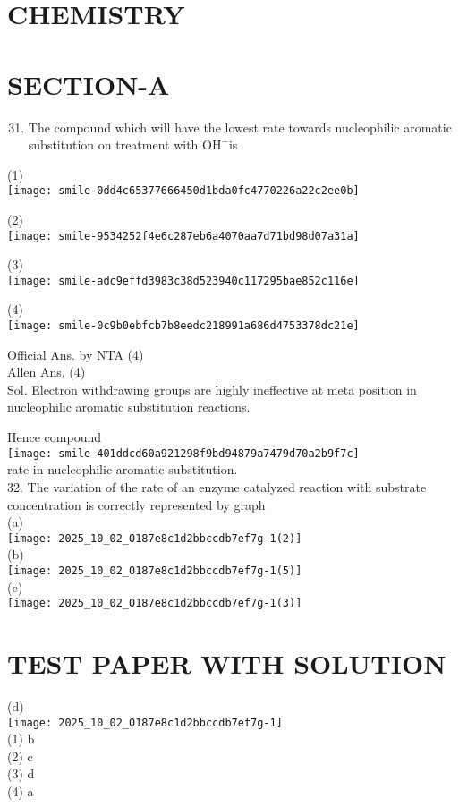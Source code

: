 \documentclass[10pt]{article}
\begin{document}
\captionsetup{singlelinecheck=false}
\section*{CHEMISTRY}
\section*{SECTION-A}
\begin{enumerate}
  \setcounter{enumi}{30}
  \item The compound which will have the lowest rate towards nucleophilic aromatic substitution on treatment with \(\mathrm{OH}^{-}\)is
\end{enumerate}

(1)\\
\texttt{[image: smile-0dd4c65377666450d1bda0fc4770226a22c2ee0b]}

(2)\\
\texttt{[image: smile-9534252f4e6c287eb6a4070aa7d71bd98d07a31a]}

(3)\\
\texttt{[image: smile-adc9effd3983c38d523940c117295bae852c116e]}

(4)\\
\texttt{[image: smile-0c9b0ebfcb7b8eedc218991a686d4753378dc21e]}

Official Ans. by NTA (4)\\
Allen Ans. (4)\\
Sol. Electron withdrawing groups are highly ineffective at meta position in nucleophilic aromatic substitution reactions.

Hence compound\\
\texttt{[image: smile-401ddcd60a921298f9bd94879a7479d70a2b9f7c]}\\
rate in nucleophilic aromatic substitution.\\
32. The variation of the rate of an enzyme catalyzed reaction with substrate concentration is correctly represented by graph\\
(a)\\
\texttt{[image: 2025\_10\_02\_0187e8c1d2bbccdb7ef7g-1(2)]}\\
(b)\\
\texttt{[image: 2025\_10\_02\_0187e8c1d2bbccdb7ef7g-1(5)]}\\
(c)\\
\texttt{[image: 2025\_10\_02\_0187e8c1d2bbccdb7ef7g-1(3)]}

\section*{TEST PAPER WITH SOLUTION}
(d)\\
\texttt{[image: 2025\_10\_02\_0187e8c1d2bbccdb7ef7g-1]}\\
(1) b\\
(2) c\\
(3) d\\
(4) a
\end{document}
